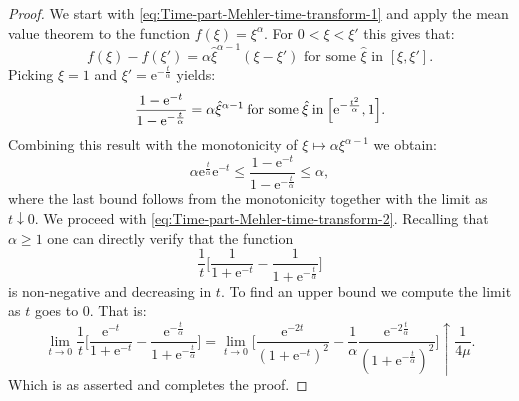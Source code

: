 \documentclass[a4paper,oneside,10pt]{amsproc}
\theoremstyle{remark}
\renewcommand{\leq}{\leqslant}
\renewcommand{\leq}{\leqslant}
\renewcommand{\geq}{\geqslant}
\newcommand{\e}{\mathrm{e}} %
\renewcommand{\leq}{\leqslant}%
\renewcommand{\geq}{\geqslant}%
\begin{document}
\begin{proof}
  We start with \eqref{eq:Time-part-Mehler-time-transform-1} and apply
  the mean value theorem to the function $f(\xi) = \xi^\alpha$. For $0
  < \xi < \xi'$ this gives that:
  \begin{equation*}
    f(\xi) - f(\xi') = \alpha \hat{\xi}^{\alpha - 1} (\xi - \xi')
    \text{ for some $\hat \xi$ in $[\xi, \xi']$}.
  \end{equation*}
  Picking $\xi = 1$ and $\xi' = \e^{-\frac{t}{\alpha}}$ yields:
  \begin{equation}
    \label{eq:Time-part-Mehler-time-transform-proof-1}
    \frac{1 - \e^{-t}}{1 - \e^{-\frac{t}{\alpha}}} = \alpha
    \hat{\xi}^{\alpha - 1} \:\text{for some}\: \hat{\xi} \:\text{in}\:
    \Bigl[\e^{-\frac{t^2}{\alpha}}, 1 \Bigr].
  \end{equation}
  Combining this result with the monotonicity of $\xi \mapsto
  \alpha \xi^{\alpha - 1}$ we obtain:
  \begin{equation*}
    \alpha \e^{\frac{t}{\alpha}} \e^{-t} \leq \frac{1 - \e^{-t}}{1 -
      \e^{-\frac{t}{\alpha}}} \leq \alpha,
  \end{equation*}
  where the last bound follows from the monotonicity together with the
  limit as $t \downarrow 0$.
  We proceed with \eqref{eq:Time-part-Mehler-time-transform-2}.
  Recalling that $\alpha \geq 1$ one can directly verify that the
  function
  \begin{equation*}
    \frac1t \biggl[\frac{1}{1 + \e^{-t}} - \frac{1}{1 +
      \e^{-\frac{t}{\alpha}}} \biggr]
  \end{equation*}
  is non-negative and decreasing in $t$. To find
  an upper bound we compute the limit as $t$ goes to $0$. That is:
  \begin{equation*}
    \lim_{t \to 0} \frac1t \biggl[\frac{\e^{-t}}{1 + \e^{-t}} -
    \frac{\e^{-\frac{t}\alpha}}{1 + \e^{-\frac{t}{\alpha}}} \biggr] 
    = \lim_{t \to 0} \biggl[\frac{\e^{-2t}}{(1 + \e^{-t})^2} -
    \frac1\alpha \frac{\e^{-2\frac{t}{\alpha}}}{(1 +
      \e^{-\frac{t}{\alpha}})^2} \biggr] \uparrow \frac{1}{4\mu}.
  \end{equation*}
  Which is as asserted and completes the proof.
\end{proof}
\end{document}
